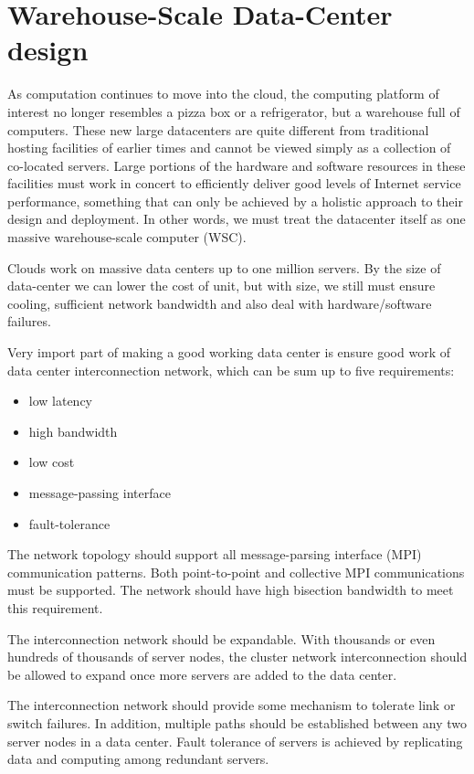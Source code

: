 \documentclass[12pt]{report}
\begin{document}
\section{Warehouse-Scale Data-Center design}
As computation continues to move into the cloud, the computing platform of interest no longer resembles a pizza box or a refrigerator, but a warehouse full of computers. These new large datacenters are quite different from traditional hosting facilities of earlier times and cannot be viewed simply as a collection of co-located servers. Large portions of the hardware and software resources in these facilities must work in concert to efficiently deliver good levels of Internet service performance, something that can only be achieved by a holistic approach to their design and deployment. In other words, we must treat the datacenter itself as one massive warehouse-scale computer (WSC).

Clouds work on massive data centers up to one million servers. By the size of data-center we can lower the cost of unit, but with size, we still must ensure cooling, sufficient network bandwidth and also deal with hardware/software failures.

Very import part of making a good working data center is ensure good work of data center interconnection network, which can be sum up to five requirements:
\begin{itemize}
\item low latency
\item high bandwidth
\item low cost
\item message-passing interface
\item fault-tolerance
\end{itemize}

The network topology should support all message-parsing interface (MPI) communication patterns. Both point-to-point and collective MPI communications must be supported. The network should have high bisection bandwidth to meet this requirement.

The interconnection network should be expandable. With thousands or even hundreds of thousands of server nodes, the cluster network interconnection should be allowed to expand once more servers are added to the data center.

The interconnection network should provide some mechanism to tolerate link or switch failures. In addition, multiple paths should be established between any two server nodes in a data center. Fault tolerance of servers is achieved by replicating data and computing among redundant servers.
\end{document}
